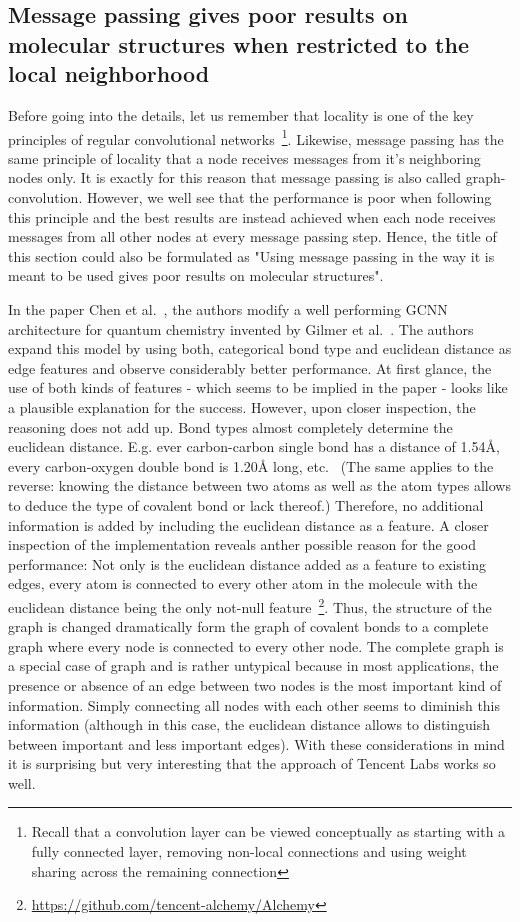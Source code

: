 \subsection{Message passing gives poor results on molecular structures when restricted to the local neighborhood}
\label{sec:neighborhood-expansion}

Before going into the details, let us remember that locality is one of the key principles of regular convolutional networks~\footnote{
	Recall that a convolution layer can be viewed conceptually as starting with a fully connected layer, removing non-local connections and using weight sharing across the remaining connection
}. Likewise, message passing has the same principle of locality that a node receives messages from it's neighboring nodes only. It is exactly for this reason that message passing is also called graph-convolution. However, we well see that the performance is poor when following this principle and the best results are instead achieved when each node receives messages from all other nodes at every message passing step. Hence, the title of this section could also be formulated as "Using message passing in the way it is meant to be used gives poor results on molecular structures".


In the paper Chen et al.~\cite{Chen2019}, the authors modify a well performing GCNN architecture for quantum chemistry invented by Gilmer et al.~\cite{Gilmer2017}. The authors expand this model by using both, categorical bond type and euclidean distance as edge features and observe considerably better performance. At first glance, the use of both kinds of features - which seems to be implied in the paper - looks like a plausible explanation for the success. However, upon closer inspection, the reasoning does not add up. Bond types almost completely determine the euclidean distance. E.g. ever carbon-carbon single bond has a distance of 1.54Å, every carbon-oxygen double bond is 1.20Å long, etc.~\cite{Organic-chemistry} (The same applies to the reverse: knowing the distance between two atoms as well as the atom types allows to deduce the type of covalent bond or lack thereof.) Therefore, no additional information is added by including the euclidean distance as a feature. A closer inspection of the implementation reveals anther possible reason for the good performance: Not only is the euclidean distance added as a feature to existing edges, every atom is connected to every other atom in the molecule with the euclidean distance being the only not-null feature~\footnote{\url{https://github.com/tencent-alchemy/Alchemy}}. Thus, the structure of the graph is changed dramatically form the graph of covalent bonds to a complete graph where every node is connected to every other node. The complete graph is a special case of graph and is rather untypical because in most applications, the presence or absence of an edge between two nodes is the most important kind of information. Simply connecting all nodes with each other seems to diminish this information (although in this case, the euclidean distance allows to distinguish between important and less important edges). With these considerations in mind it is surprising but very interesting that the approach of Tencent Labs works so well.

